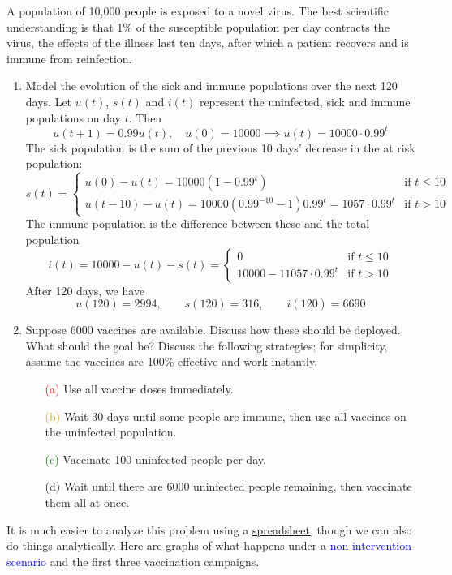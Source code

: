 \label{pg:virus}

A population of 10,000 people is exposed to a novel virus. The best scientific understanding is that 1\% of the susceptible population per day contracts the virus, the effects of the illness last ten days, after which a patient recovers and is immune from reinfection.
\begin{enumerate}
  \item Model the evolution of the sick and immune populations over the next 120 days.\smallbreak
  Let $u(t)$, $s(t)$ and $i(t)$ represent the uninfected, sick and immune populations on day $t$. Then
\[u(t+1)= 0.99u(t),\quad u(0)=10000\implies u(t)=10000\cdot 0.99^t\]
The sick population is the sum of the previous 10 days' decrease in the at risk population:
\[s(t)=\begin{cases}
u(0)-u(t)=10000(1-0.99^t)&\text{if }t\le 10\\
u(t-10)-u(t)=10000(0.99^{-10}-1)0.99^t=1057\cdot 0.99^t&\text{if }t> 10
\end{cases}\]
The immune population is the difference between these and the total population
\[i(t)=10000-u(t)-s(t)=\begin{cases}
0&\text{if }t\le 10\\
10000-11057\cdot 0.99^t&\text{if }t> 10
\end{cases}\]
After 120 days, we have
\[u(120)=2994,\qquad s(120)=316,\qquad i(120)=6690\]
  
  \item Suppose 6000 vaccines are available. Discuss how these should be deployed. What should the goal be? Discuss the following strategies; for simplicity, assume the vaccines are 100\% effective and work instantly.
  \begin{enumerate}
    \item[\textcolor{red}{(a)}] Use all vaccine doses immediately.
  	\item[\textcolor{Goldenrod}{(b)}] Wait 30 days until some people are immune, then use all vaccines on the uninfected population.
  	\item[\textcolor{Green}{(c)}] Vaccinate 100 uninfected people per day.
  	\item[(d)] Wait until there are 6000 uninfected people remaining, then vaccinate them all at once.
	\end{enumerate}
\end{enumerate}
It is much easier to analyze this problem using a \href{http://math.uci.edu/~ndonalds/math8/virus.xlsx}{spreadsheet,} though we can also do things analytically. Here are graphs of what happens under a \textcolor{blue}{non-intervention scenario} and the first three vaccination campaigns.
